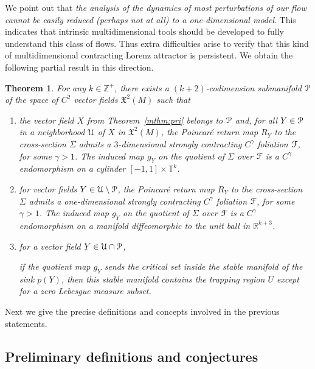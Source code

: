 \documentclass[reqno,12pt,a4paper]{amsart}
\theoremstyle{plain}
\newtheorem{maintheorem}{Theorem}
\theoremstyle{definition}
\begin{document}
We point out that \emph{the analysis of the dynamics of most
  perturbations of our flow cannot be easily reduced
  (perhaps not at all) to a one-dimensional model}. This
indicates that intrinsic multidimensional tools should be
developed to fully understand this class of flows. Thus
extra difficulties arise to verify that this kind of
multidimensional contracting Lorenz attractor is persistent.
We obtain the following partial result in this direction.
\begin{maintheorem}
  \label{mthm:codimension}
  For any $k\in{{\mathbb Z}}^+$, there exists a $(k+2)$-codimension
  submanifold ${\EuScript{P}}$ of the space of $C^2$ vector fields
  ${{\mathfrak X}}^2(M)$ such that
  \begin{enumerate}
  \item 
    the vector field $X$ from Theorem~\ref{mthm:pri} belongs
    to ${\EuScript{P}}$ and, for all $Y\in{\EuScript{P}}$ in a neighborhood ${\EuScript{U}}$
    of $X$ in ${{\mathfrak X}}^2(M)$, the Poincar\'e return map $R_Y$ to
    the cross-section $\Sigma$ admits a $3$-dimensional
    strongly contracting $C^\gamma$ foliation ${\EuScript{F}}$, for
    some $\gamma>1$.  The induced map $g_Y$ on the quotient
    of $\Sigma$ over ${\EuScript{F}}$ is a $C^{\gamma}$ endomorphism on
    a cylinder $[-1,1]\times{{\mathbb T}}^k$.
  \item 
    for vector fields $Y\in{\EuScript{U}}\setminus{\EuScript{P}}$, the
    Poincar\'e return map $R_Y$ to the cross-section
    $\Sigma$ admits a one-dimensional strongly contracting
    $C^\gamma$ foliation ${\EuScript{F}}$, for some $\gamma>1$.  The
    induced map $g_Y$ on the quotient of $\Sigma$ over ${\EuScript{F}}$
    is a $C^{\gamma}$ endomorphism on a manifold
    diffeomorphic to the unit ball in ${{\mathbb R}}^{k+3}$.
  \item for a vector field $Y\in{\EuScript{U}}\cap{\EuScript{P}}$, 
    
    
    \emph{if} the quotient map $g_Y$ sends the critical set
    inside the stable manifold of the sink $p(Y)$,
    \emph{then} this stable manifold contains the trapping
    region $U$ except for a zero Lebesgue measure subset.
  \end{enumerate}
\end{maintheorem}

Next we give the precise definitions and concepts involved
in the previous statements.

\subsection{Preliminary definitions and conjectures}
\label{sec:preliminaryresults}
\end{document}
